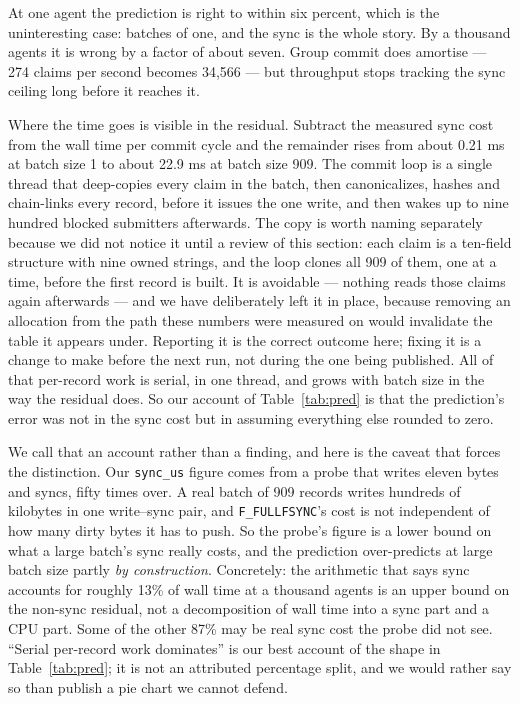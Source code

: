 \documentclass[11pt]{article}
\begin{document}
At one agent the prediction is right to within six percent, which is the
uninteresting case: batches of one, and the sync is the whole story. By a
thousand agents it is wrong by a factor of about seven. Group commit does
amortise --- 274 claims per second becomes 34,566 --- but throughput
stops tracking the sync ceiling long before it reaches it.

Where the time goes is visible in the residual. Subtract the measured sync cost
from the wall time per commit cycle and the remainder rises from about
0.21 ms at batch size 1 to about 22.9 ms at
batch size 909. The commit loop is a single thread that deep-copies every
claim in the batch, then canonicalizes, hashes and chain-links every record,
before it issues the one write, and then wakes up to nine hundred blocked
submitters afterwards. The copy is worth naming separately because we did not
notice it until a review of this section: each claim is a ten-field structure
with nine owned strings, and the loop clones all 909 of them, one at a time,
before the first record is built. It is avoidable --- nothing reads those
claims again afterwards --- and we have deliberately left it in place, because
removing an allocation from the path these numbers were measured on would
invalidate the table it appears under. Reporting it is the correct outcome
here; fixing it is a change to make before the next run, not during the one
being published. All of that per-record work is serial, in one thread, and
grows with batch size in the way the residual does. So our account of
Table~\ref{tab:pred} is that the prediction's error was not in the sync cost
but in assuming everything else rounded to zero.

We call that an account rather than a finding, and here is the caveat that
forces the distinction. Our
\texttt{sync\_us} figure comes from a probe that writes eleven bytes and syncs,
fifty times over. A real batch of 909 records writes hundreds of kilobytes in
one write--sync pair, and \texttt{F\_FULLFSYNC}'s cost is not independent of how
many dirty bytes it has to push. So the probe's figure is a lower bound on what
a large batch's sync really costs, and the prediction over-predicts at large
batch size partly \emph{by construction}. Concretely: the arithmetic that says
sync accounts for roughly 13\% of wall time at a thousand agents
is an upper bound on the non-sync residual, not a decomposition of wall time
into a sync part and a CPU part. Some of the other 87\% may be
real sync cost the probe did not see. ``Serial per-record work dominates'' is
our best account of the shape in Table~\ref{tab:pred}; it is not an attributed
percentage split, and we would rather say so than publish a pie chart we cannot
defend.
\end{document}
